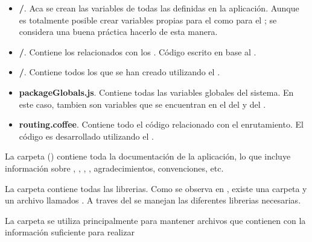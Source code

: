 

\begin{itemize}
	\item
		\textbf{\folderCollections/}. Aca se crean las variables de todas las \collectionsMETEOR definidas en la aplicación. Aunque es totalmente posible crear variables propias para el \clientAS como para el \serverAS; se considera una buena práctica hacerlo de esta manera.
	\item
	 	\textbf{\folderHooks/}. Contiene los \hooksCPT relacionados con los \collectionsMETEOR. Código escrito en base al \packagesAS \nameCollectionHooks.
	\item
		\textbf{\folderSchemas/}. Contiene todos los \schemasDB que se han creado utilizando el \packagesAS \collectionsMETEOR.
	\item
		\textbf{packageGlobals.js}. Contiene todas las variables globales del sistema. En este caso, tambien son variables que se encuentran en el \environmentPL del \clientAS y del \serverAS.
	\item
		\textbf{routing.coffee}. Contiene todo el código relacionado con el enrutamiento. El código es desarrollado utilizando el \packagesAS \nameRouter.
\end{itemize}



La carpeta \folderDocs () contiene toda la documentación de la aplicación, lo que incluye información sobre \deploymentCPT, \packagesAS, \routingAS, \templatesMETEOR, agradecimientos, convenciones, etc.



La carpeta \folderLib contiene todas las librerias. Como se observa en , existe una carpeta y un archivo \jsonNAME llamados \folderBower. A traves del \packagesAS \nameBower se manejan las diferentes librerias necesarias.



La carpeta \privateFolder se utiliza principalmente para mantener archivos \jsonNAME que contienen \collectionsMETEOR con la información suficiente para realizar 

